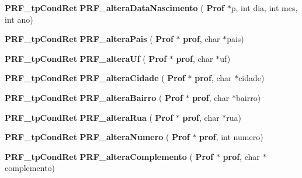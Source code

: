\begin{DoxyCompactItemize}
\textbf{ P\+R\+F\+\_\+tp\+Cond\+Ret} {\bfseries P\+R\+F\+\_\+altera\+Data\+Nascimento} (\textbf{ Prof} $\ast$p, int dia, int mes, int ano)
\item 
\textbf{ P\+R\+F\+\_\+tp\+Cond\+Ret} {\bfseries P\+R\+F\+\_\+altera\+Pais} (\textbf{ Prof} $\ast$\textbf{ prof}, char $\ast$pais)
\item 
\textbf{ P\+R\+F\+\_\+tp\+Cond\+Ret} {\bfseries P\+R\+F\+\_\+altera\+Uf} (\textbf{ Prof} $\ast$\textbf{ prof}, char $\ast$uf)
\item 
\textbf{ P\+R\+F\+\_\+tp\+Cond\+Ret} {\bfseries P\+R\+F\+\_\+altera\+Cidade} (\textbf{ Prof} $\ast$\textbf{ prof}, char $\ast$cidade)
\item 
\textbf{ P\+R\+F\+\_\+tp\+Cond\+Ret} {\bfseries P\+R\+F\+\_\+altera\+Bairro} (\textbf{ Prof} $\ast$\textbf{ prof}, char $\ast$bairro)
\item 
\textbf{ P\+R\+F\+\_\+tp\+Cond\+Ret} {\bfseries P\+R\+F\+\_\+altera\+Rua} (\textbf{ Prof} $\ast$\textbf{ prof}, char $\ast$rua)
\item 
\textbf{ P\+R\+F\+\_\+tp\+Cond\+Ret} {\bfseries P\+R\+F\+\_\+altera\+Numero} (\textbf{ Prof} $\ast$\textbf{ prof}, int numero)
\item 
\textbf{ P\+R\+F\+\_\+tp\+Cond\+Ret} {\bfseries P\+R\+F\+\_\+altera\+Complemento} (\textbf{ Prof} $\ast$\textbf{ prof}, char $\ast$complemento)
\end{DoxyCompactItemize}
